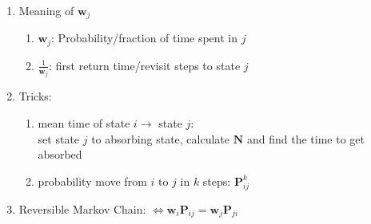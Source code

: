 \documentclass[10pt]{article}
\newcommand{\Ib}{\mathbf{I}}
\newcommand{\Pb}{\mathbf{P}}
\newcommand{\Nb}{\mathbf{N}}
\begin{document}
\begin{multicols}{2}
\begin{enumerate}
\begin{enumerate}
	\item Meaning of $\mathbf{w}_j$
	\begin{enumerate}
		\item $\mathbf{w}_j$: Probability/fraction of time spent  in $j$
		\item $\frac{1}{\mathbf{w}_j}$: first return time/revisit steps  to state $j$
	\end{enumerate}
	\item Tricks:
	\begin{enumerate}
		\item mean time of state $i\rightarrow$ state $j$:\\
		set state $j$ to absorbing state, calculate $\Nb$ and find the time to get absorbed
		\item probability move from $i$ to $j$ in $k$ steps: $\Pb^{k}_{ij}$
	\end{enumerate}
	\item Reversible Markov Chain: $\Leftrightarrow \mathbf{w}_i \mathbf{P}_{ij} = \mathbf{w}_j \mathbf{P}_{ji}$
\end{enumerate}


\end{enumerate}
\end{multicols}
\end{document}
